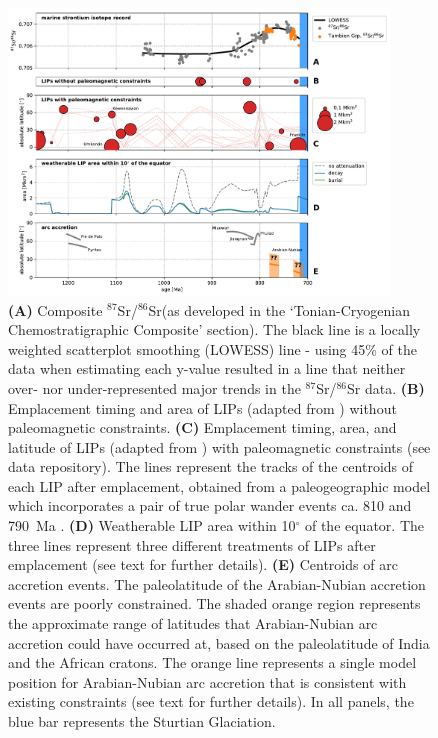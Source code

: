 \documentclass[11pt,letterpaper]{article}
\newcommand{\SrSr}{$^{87}$Sr/$^{86}$Sr\xspace}
\begin{document}
\begin{figure}[h!]
\begin{center}
	\includegraphics[width=0.9\textwidth]{Figures/SrSr_LIPs.pdf}
	\caption{\textbf{(A)} Composite \SrSr (as developed in the `Tonian-Cryogenian Chemostratigraphic Composite' section). The black line is a locally weighted scatterplot smoothing (LOWESS) line - using 45\% of the data when estimating each y-value resulted in a line that neither over- nor under-represented major trends in the \SrSr data. \textbf{(B)} Emplacement timing and area of LIPs (adapted from \citealp{Ernst2017a}) without paleomagnetic constraints. \textbf{(C)} Emplacement timing, area, and latitude of LIPs (adapted from \citealp{Ernst2017a}) with paleomagnetic constraints (see data repository). The lines represent the tracks of the centroids of each LIP after emplacement, obtained from a paleogeographic model \citep{Swanson-Hysell2018a} which incorporates a pair of true polar wander events ca. 810 and 790~Ma \citep{Maloof2010a, Swanson-Hysell2012a}. \textbf{(D)} Weatherable LIP area within 10$^{\circ}$ of the equator. The three lines represent three different treatments of LIPs after emplacement (see text for further details). \textbf{(E)} Centroids of arc accretion events. The paleolatitude of the Arabian-Nubian accretion events are poorly constrained. The shaded orange region represents the approximate range of latitudes that Arabian-Nubian arc accretion could have occurred at, based on the paleolatitude of India and the African cratons. The orange line represents a single model position for Arabian-Nubian arc accretion that is consistent with existing constraints (see text for further details). In all panels, the blue bar represents the Sturtian Glaciation.}
	\label{fig:SrSr_LIPs}
\end{center}
\end{figure}
\end{document}
